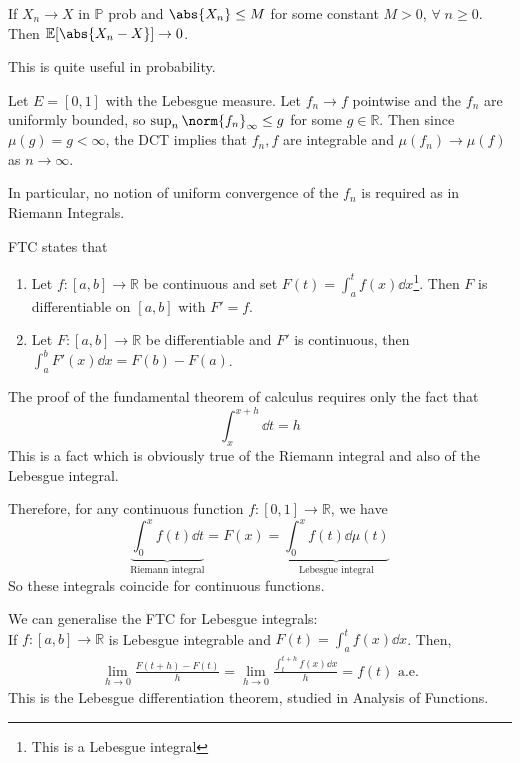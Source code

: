 \begin{theorem}
	If $X_n \to X$ in $\mathbb{P}$ prob and $\abs{X_n} \leq M$ for some constant $M > 0$, $\forall \; n \geq 0$.
	Then $\mathbb{E}[\abs{X_n - X}] \to 0$.
\end{theorem}

This is quite useful in probability.

\begin{example}
	Let $E = [0,1]$ with the Lebesgue measure.
	Let $f_n \to f$ pointwise and the $f_n$ are uniformly bounded, so $\sup_n \norm{f_n}_\infty \leq g$ for some $g \in \mathbb R$.
	Then since $\mu(g) = g < \infty$, the DCT implies that $f_n, f$ are integrable and $\mu(f_n) \to \mu(f)$ as $n \to \infty$.

	In particular, no notion of uniform convergence of the $f_n$ is required as in Riemann Integrals.
\end{example}

\begin{remark}
	FTC states that
	\begin{enumerate}
		\item Let $f : [a, b] \to \mathbb{R}$ be continuous and set $F(t) = \int_{a}^{t} f(x) \dd{x}$\footnote{This is a Lebesgue integral}.
		Then $F$ is differentiable on $[a, b]$ with $F' = f$.
		\item Let $F : [a, b] \to \mathbb{R}$ be differentiable and $F'$ is continuous, then $\int_{a}^{b} F'(x) \dd{x} = F(b) - F(a)$.
	\end{enumerate}
	The proof of the fundamental theorem of calculus requires only the fact that
	\[ \int_x^{x + h} \dd{t} = h \]
	This is a fact which is obviously true of the Riemann integral and also of the Lebesgue integral.

	Therefore, for any continuous function $f \colon [0,1] \to \mathbb R$, we have
	\[ \underbrace{\int_0^x f(t) \dd{t}}_{\text{Riemann integral}} = F(x) = \underbrace{\int_0^x f(t) \dd{\mu(t)}}_{\text{Lebesgue integral}} \]
	So these integrals coincide for continuous functions.
\end{remark}

\begin{remark}
	We can generalise the FTC for Lebesgue integrals: \\
	If $f : [a, b] \to \mathbb{R}$ is Lebesgue integrable and $F(t) = \int_{a}^{t} f(x) \dd{x}$.
	Then,
	\begin{align*}
		\lim_{h \to 0} \frac{F(t+h) - F(t)}{h} = \lim_{h \to 0} \frac{\int_{t}^{t + h} f(x) \dd{x}}{h} = f(t) \text{ a.e.}
	\end{align*}
	This is the Lebesgue differentiation theorem, studied in Analysis of Functions.
\end{remark}

